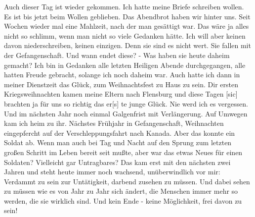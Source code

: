 \def\day{24. Dezember 1943.}
\mktitle

Auch dieser Tag ist wieder gekommen.
Ich hatte meine Briefe schreiben wollen.
Es ist bis jetzt beim Wollen geblieben.
Das Abendbrot haben wir hinter uns.
Seit Wochen wieder mal eine Mahlzeit, nach der man ges\"{a}ttigt war.
Das w\"{a}re ja alles nicht so schlimm, wenn man nicht so viele Gedanken h\"{a}tte.
Ich will aber keinen davon niederschreiben, keinen einzigen.
Denn sie sind es nicht wert.
Sie fallen mit der Gefangenschaft.
Und wann endet diese?
- Was haben sie heute daheim gemacht?
Ich bin in Gedanken alle letzten Heiligen Abende durchgegangen, alle hatten Freude gebracht, solange ich noch daheim war.
Auch hatte ich dann in meiner Dienstzeit das Gl\"{u}ck, zum Weihnachtsfest zu Haus zu sein.
Dir ersten Kriegsweihnachten kamen meine Eltern nach Flensburg und diese Tagen{\color{red} [sic] brachten ja f\"{u}r uns so richtig das er[s] }te junge Gl\"{u}ck.
Nie werd ich es vergessen.
Und im n\"{a}chsten Jahr noch einmal Galgenfrist mit Verl\"{a}ngerung.
Auf Umwegen kam ich heim zu ihr.
N\"{a}chstes Fr\"{u}hjahr in Gefangenschaft, Weihnachten eingepfercht auf der Verschleppungsfahrt nach Kanada.
Aber das konnte ein Soldat ab.
Wenn man auch bei Tag und Nacht auf den Sprung zum letzten gro{\ss}en Schritt im Leben bereit seit mu{\ss}te, aber war das etwas Neues f\"{u}r einen Soldaten?
Vielleicht gar Untragbares?
Das kam erst mit den n\"{a}chsten zwei Jahren und steht heute immer noch wachsend, un\"{u}berwindlich vor mir: Verdammt zu sein zur Unt\"{a}tigkeit, darbend zusehen zu m\"{u}ssen.
Und dabei sehen zu m\"{u}ssen wie es von Jahr zu Jahr sich \"{a}ndert, die Menschen immer mehr so werden, die sie wirklich sind.
Und kein Ende - keine M\"{o}glichkeit, frei davon zu sein!

\clearpage
